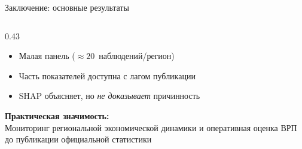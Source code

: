 \documentclass[aspectratio=169,12pt]{beamer}
\begin{document}
\begin{frame}{Заключение: основные результаты}
\begin{columns}[T]
\begin{column}{0.43\textwidth}
\begin{itemize}
      \item Малая панель ($\approx 20$~наблюдений/регион)
      \item Часть показателей доступна с лагом публикации
      \item SHAP объясняет, но \textit{не доказывает} причинность
    \end{itemize}
    \vspace{0.4em}
    \textbf{\color{hsedark}Практическая значимость:}\\
    {\small Мониторинг региональной экономической динамики
    и оперативная оценка ВРП до публикации официальной статистики}
  \end{column}
\end{columns}
\end{frame}

\end{document}
